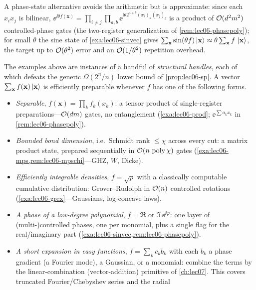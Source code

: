 \begin{remark}
A phase-state alternative avoids the arithmetic but is approximate: since each
$x_ix_j$ is bilinear, $\ee^{\ii\theta f(\mathbf x)}=\prod_{i\neq j}\prod_{a,b}
\ee^{\ii\theta 2^{a+b}(x_i)_a(x_j)_b}$ is a product of $\mathcal{O}(d^2m^2)$ controlled-phase
gates (the two-register generalization of \cref{rem:lec06-phasepoly}); for small
$\theta$ the sine state of \cref{exa:lec06-sinvec} gives
$\sum_{\mathbf x}\sin(\theta f)\ket{\mathbf x}\approx\theta\sum_{\mathbf x}f\,
\ket{\mathbf x}$, the target up to $\mathcal{O}(\theta^2)$ error and an $\mathcal{O}(1/\theta^2)$
repetition overhead.
\end{remark}

\begin{remark}
\label{rem:lec06-toolbox}
The examples above are instances of a handful of \emph{structural handles}, each of
which defeats the generic $\Omega(2^n/n)$ lower bound of \cref{prop:lec06-sp}. A vector
$\sum_{\mathbf x}f(\mathbf x)\ket{\mathbf x}$ is efficiently preparable whenever
$f$ has one of the following forms.
\begin{itemize}[leftmargin=1.4em,nosep]
  \item \emph{Separable}, $f(\mathbf x)=\prod_k f_k(x_k)$: a tensor product of
        single-register preparations---$\mathcal{O}(dm)$ gates, no entanglement
        (\cref{exa:lec06-prod}; $\ee^{\sum a_kx_k}$ in \cref{rem:lec06-phasepoly}).
  \item \emph{Bounded bond dimension}, i.e.\ Schmidt rank $\le\chi$ across every cut:
        a matrix product state, prepared sequentially in $\mathcal{O}(n\,\operatorname{poly}\chi)$ gates
        (\cref{exa:lec06-mps,rem:lec06-mpschi}---GHZ, $W$, Dicke).
  \item \emph{Efficiently integrable densities}, $f=\sqrt{p}$ with a classically
        computable cumulative distribution: Grover--Rudolph in $\mathcal{O}(n)$ controlled
        rotations (\cref{exa:lec06-grex}---Gaussians, log-concave laws).
  \item \emph{A phase of a low-degree polynomial}, $f=\Re$ or $\Im\,\ee^{\ii\varphi}$:
        one layer of (multi-)controlled phases, one per monomial, plus a single flag
        for the real/imaginary part (\cref{exa:lec06-sinvec,rem:lec06-phasepoly}).
  \item \emph{A short expansion in easy functions}, $f=\sum_{k} c_k b_k$ with each
        $b_k$ a phase gradient (a Fourier mode), a Gaussian, or a monomial: combine the
        terms by the linear-combination (vector-addition) primitive of \cref{ch:lec07}.
        This covers truncated Fourier/Chebyshev series and the radial

\end{itemize}
\end{remark}
